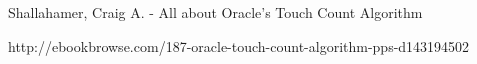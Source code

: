 

 \begin{thebibliography}{2}

 Shallahamer, Craig A. - All about Oracle's Touch Count Algorithm

http://ebookbrowse.com/187-oracle-touch-count-algorithm-pps-d143194502 
 
\end{thebibliography}
